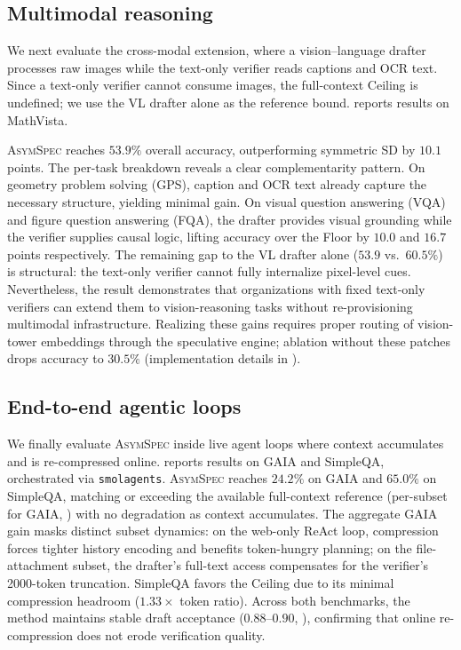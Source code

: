 \documentclass[11pt]{article}
\theoremstyle{plain}
\theoremstyle{definition}
\begin{document}
\subsection{Multimodal reasoning}
\label{sec:results-mv}

We next evaluate the cross-modal extension, where a vision--language drafter processes raw images while the text-only verifier reads captions and OCR text. Since a text-only verifier cannot consume images, the full-context Ceiling is undefined; we use the VL drafter alone as the reference bound.  reports results on MathVista.

\textsc{AsymSpec} reaches $53.9\%$ overall accuracy, outperforming symmetric SD by $10.1$ points. The per-task breakdown reveals a clear complementarity pattern. On geometry problem solving (GPS), caption and OCR text already capture the necessary structure, yielding minimal gain. On visual question answering (VQA) and figure question answering (FQA), the drafter provides visual grounding while the verifier supplies causal logic, lifting accuracy over the Floor by $10.0$ and $16.7$ points respectively. The remaining gap to the VL drafter alone ($53.9$ vs.\ $60.5\%$) is structural: the text-only verifier cannot fully internalize pixel-level cues. Nevertheless, the result demonstrates that organizations with fixed text-only verifiers can extend them to vision-reasoning tasks without re-provisioning multimodal infrastructure. Realizing these gains requires proper routing of vision-tower embeddings through the speculative engine; ablation without these patches drops accuracy to $30.5\%$ (implementation details in ).

\subsection{End-to-end agentic loops}
\label{sec:results-gaia}

We finally evaluate \textsc{AsymSpec} inside live agent loops where context accumulates and is re-compressed online.  reports results on GAIA and SimpleQA, orchestrated via \texttt{smolagents}. \textsc{AsymSpec} reaches $24.2\%$ on GAIA and $65.0\%$ on SimpleQA, matching or exceeding the available full-context reference (per-subset for GAIA, ) with no degradation as context accumulates. The aggregate GAIA gain masks distinct subset dynamics: on the web-only ReAct loop, compression forces tighter history encoding and benefits token-hungry planning; on the file-attachment subset, the drafter's full-text access compensates for the verifier's 2000-token truncation. SimpleQA favors the Ceiling due to its minimal compression headroom ($1.33\times$ token ratio). Across both benchmarks, the method maintains stable draft acceptance ($0.88$--$0.90$, ), confirming that online re-compression does not erode verification quality.
\end{document}
